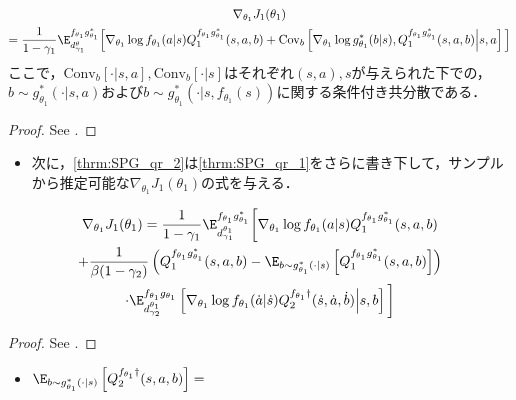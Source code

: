 \documentclass[a4paper,10pt,dvipdfmx]{jsarticle}
\begin{document}
\begin{theorem}\label{thrm:SPG_qr_1}
    \begin{multline}
    \nabla_{\theta_1}J_1(\theta_1)\\
    =\dfrac{1}{1-\gamma_1}\E_{d_{\gamma_1}^{\theta}}^{f_{\theta_1}g_{\theta_1}^*}\Big[\nabla_{\theta_1}\log f_{\theta_1}(a|s)Q_1^{f_{\theta_1}g_{\theta_1}^*}(s,a,b)
    +\mathrm{Cov}_{b}\left[\nabla_{\theta_1}\log g_{\theta_1}^*(b|s),Q_1^{f_{\theta_1}g_{\theta_1}^*}(s,a,b)\middle|s,a\right]\Big]
    \end{multline}
    ここで，$\mathrm{Conv}_{b}[\cdot|s,a],\mathrm{Conv}_{b}[\cdot|s]$はそれぞれ$(s,a),s$が与えられた下での，$b\sim g_{\theta_1}^*(\cdot|s,a)$および$b\sim g_{\theta_1}^*(\cdot|s,f_{\theta_1}(s))$に関する条件付き共分散である．
\end{theorem}
\begin{proof}
    See .
\end{proof}

\begin{itemize}
    \item 次に，\cref{thrm:SPG_qr_2}は\cref{thrm:SPG_qr_1}をさらに書き下して，サンプルから推定可能な$\nabla_{\theta_1}J_1(\theta_1)$の式を与える．
\end{itemize}

\begin{theorem}\label{thrm:SPG_qr_2}
    \begin{multline}
        \nabla_{\theta_1}J_1(\theta_1)
        =\dfrac{1}{1-\gamma_1}\E_{d_{\gamma_1}^{\theta_1}}^{f_{\theta_1}g_{\theta_1}^*}\bigg[\nabla_{\theta_1}\log f_{\theta_1}(a|s)Q_1^{f_{\theta_1}g_{\theta_1}^*}(s,a,b)\\
        +\dfrac{1}{\beta(1-\gamma_2)}\left(Q_1^{f_{\theta_1}g_{\theta_1}^*}(s,a,b)-\E_{b\sim g_{\theta_1}^*(\cdot|s)}\left[Q_1^{f_{\theta_1}g_{\theta_1}^*}(s,a,b)\right]\right)\\
        \cdot\E_{d_{\gamma_2}^{\theta_1}}^{f_{\theta_1}g_{\theta_1}}\left[\nabla_{\theta_1}\log f_{\theta_1}(\dot{a}|\dot{s})Q_2^{f_{\theta_1}\dag}(\dot{s},\dot{a},\dot{b})\middle|s,b\right]\bigg]
        \label{eq:SPG_qr_2}
    \end{multline}
\end{theorem}
\begin{proof}
    See .
\end{proof}

\begin{itemize}
    \item $\E_{b\sim g_{\theta_1}^*(\cdot\mid s)}\left[Q_2^{f_{\theta_1}\dag}(s,a,b)\right] = $
\end{itemize}
\end{document}
